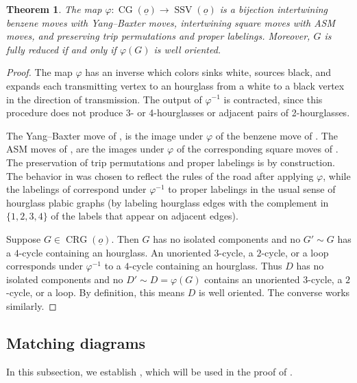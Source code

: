 \documentclass{amsart}
\newtheorem{theorem}{Theorem}[section]
\theoremstyle{definition}
\theoremstyle{remark}
\numberwithin{equation}{section}
\DeclareMathOperator{\crg}{CRG}
\DeclareMathOperator{\cg}{CG}
\DeclareMathOperator{\ssv}{SSV}
\begin{document}
\begin{theorem}
\label{thm:6-vertex-hourglass-correspondence}
The map $\varphi : \cg(\underline{o}) \to \ssv(\underline{o})$ is a bijection intertwining benzene moves with Yang--Baxter moves, intertwining square moves with ASM moves, and preserving trip permutations and proper labelings. Moreover, $G$ is fully reduced if and only if $\varphi(G)$ is well oriented. 
\end{theorem}
\begin{proof}
The map $\varphi$ has an inverse which colors sinks white, sources black, and expands each transmitting vertex to an hourglass from a white to a black vertex in the direction of transmission. The output of $\varphi^{-1}$ is contracted, since this procedure does not produce 3- or 4-hourglasses or adjacent pairs of 2-hourglasses.

The Yang--Baxter move of , is the image under $\varphi$ of the benzene move of . The ASM moves of , are the images under $\varphi$ of the corresponding square moves of . The preservation of trip permutations and proper labelings is by construction. The behavior in  was chosen to reflect the rules of the road after applying $\varphi$, while the labelings of  correspond under $\varphi^{-1}$ to proper labelings in the usual sense of hourglass plabic graphs (by labeling hourglass edges with the complement in $\{1,2,3,4\}$ of the labels that appear on adjacent edges).

    
Suppose $G\in \crg(\underline{o})$. Then $G$ has no isolated components and no $G'\sim G$ has a $4$-cycle containing an hourglass. An unoriented $3$-cycle, a $2$-cycle, or a loop corresponds under $\varphi^{-1}$ to a $4$-cycle containing an hourglass. Thus $D$ has no isolated components and no $D' \sim D=\varphi(G)$ contains an unoriented $3$-cycle, a $2$-cycle, or a loop. By definition, this means $D$ is well oriented. The converse works similarly.
\end{proof}

\subsection{Matching diagrams}
In this subsection, we establish , which will be used in the proof of .
\end{document}
